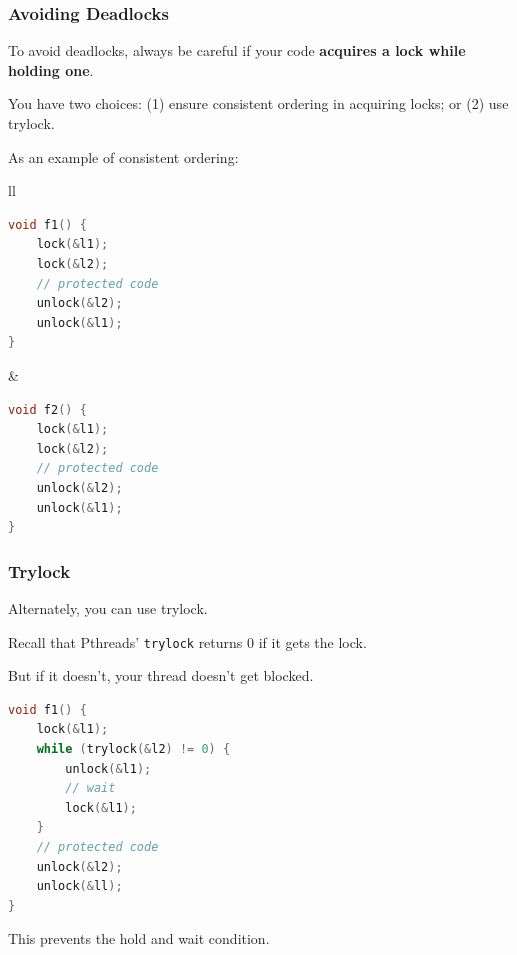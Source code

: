 \begin{frame}[fragile]
\frametitle{Avoiding Deadlocks}

To avoid deadlocks, always be careful if your code {\bf acquires a lock while holding one}.  
  
You have two choices: (1) ensure consistent ordering in acquiring locks; or (2) use trylock.

As an example of consistent ordering:
\begin{center}
\begin{tabular}{ll}
\begin{minipage}{.4\textwidth}
  \begin{lstlisting}[language=C]
void f1() {
    lock(&l1);
    lock(&l2);
    // protected code
    unlock(&l2);
    unlock(&l1);    
}
\end{lstlisting}
\end{minipage}&
\begin{minipage}{.4\textwidth}
\begin{lstlisting}[language=C]
void f2() {
    lock(&l1);
    lock(&l2);
    // protected code
    unlock(&l2);
    unlock(&l1);    
}
  \end{lstlisting}
\end{minipage}
\end{tabular}
\end{center}

\end{frame}



\begin{frame}[fragile]
\frametitle{Trylock}

Alternately, you can use trylock. 

Recall that Pthreads' {\tt trylock} returns 0 if it gets the lock. 

But if it doesn't, your thread doesn't get blocked. 

\begin{lstlisting}[language=C]
void f1() {
    lock(&l1);
    while (trylock(&l2) != 0) {
        unlock(&l1);
        // wait
        lock(&l1);
    }
    // protected code
    unlock(&l2);
    unlock(&ll);    
}
\end{lstlisting}

This prevents the hold and wait condition.

\end{frame}



